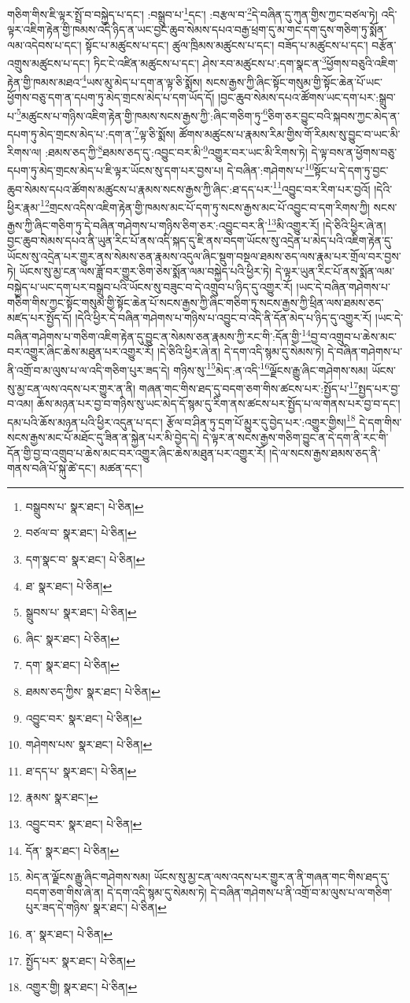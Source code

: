 གཅིག་གིས་ཇི་ལྟར་སྤྲོ་བ་བསྐྱེད་པ་དང་། :བསྒྲུབ་པ་\footnote{བསྒྲུབས་པ་  སྣར་ཐང་།  པེ་ཅིན། }དང་། :བརྩལ་བ་\footnote{བཙལ་བ་  སྣར་ཐང་།  པེ་ཅིན། }དེ་བཞིན་དུ་ཀུན་གྱིས་ཀྱང་བཙལ་ཏེ། འདི་ལྟར་འཇིག་རྟེན་གྱི་ཁམས་འདི་ཉིད་ན་ཡང་བྱང་ཆུབ་སེམས་དཔའ་བརྒྱ་ཕྲག་དུ་མ་གང་དག་དུས་གཅིག་ཏུ་སྨོན་ལམ་འདེབས་པ་དང་། སྟོང་པ་མཚུངས་པ་དང་། ཚུལ་ཁྲིམས་མཚུངས་པ་དང་། བཟོད་པ་མཚུངས་པ་དང་། བརྩོན་འགྲུས་མཚུངས་པ་དང་། ཏིང་ངེ་འཛིན་མཚུངས་པ་དང་། ཤེས་རབ་མཚུངས་པ་:དག་སྣང་ན་\footnote{དག་སྣང་བ་  སྣར་ཐང་།  པེ་ཅིན། }ཕྱོགས་བཅུའི་འཇིག་རྟེན་གྱི་ཁམས་མཐའ་\footnote{ཐ་  སྣར་ཐང་།  པེ་ཅིན། }ཡས་མུ་མེད་པ་དག་ན་ལྟ་ཅི་སྨོས། སངས་རྒྱས་ཀྱི་ཞིང་སྟོང་གསུམ་གྱི་སྟོང་ཆེན་པོ་ཡང་ཕྱོགས་བཅུ་དག་ན་དཔག་ཏུ་མེད་གྲངས་མེད་པ་དག་ཡོད་དོ། །བྱང་ཆུབ་སེམས་དཔའ་ཚོགས་ཡང་དག་པར་:སྒྲུབ་པ་\footnote{སྒྲུབས་པ་  སྣར་ཐང་།  པེ་ཅིན། }མཚུངས་པ་གཉིས་འཇིག་རྟེན་གྱི་ཁམས་སངས་རྒྱས་ཀྱི་:ཞིང་གཅིག་ཏུ་\footnote{ཞིང་  སྣར་ཐང་།  པེ་ཅིན། }ཅིག་ཅར་བྱུང་བའི་སྐབས་ཀྱང་མེད་ན་དཔག་ཏུ་མེད་གྲངས་མེད་པ་:དག་ན་\footnote{དག་  སྣར་ཐང་།  པེ་ཅིན། }ལྟ་ཅི་སྨོས། ཚོགས་མཚུངས་པ་རྣམས་རིམ་གྱིས་གོ་རིམས་སུ་བྱུང་བ་ཡང་མི་རིགས་ལ། :ཐམས་ཅད་ཀྱི་\footnote{ཐམས་ཅད་ཀྱིས་  སྣར་ཐང་།  པེ་ཅིན། }ཐམས་ཅད་དུ་:འབྱུང་བར་མི་\footnote{འབྱུང་བར་  སྣར་ཐང་།  པེ་ཅིན། }འགྱུར་བར་ཡང་མི་རིགས་ཏེ། དེ་ལྟ་བས་ན་ཕྱོགས་བཅུ་དཔག་ཏུ་མེད་གྲངས་མེད་པ་ཇི་ལྟར་ཡོངས་སུ་དག་པར་བྱས་པ། དེ་བཞིན་:གཤེགས་པ་\footnote{གཤེགས་པས་  སྣར་ཐང་།  པེ་ཅིན། }སྟོང་པ་དེ་དག་ཏུ་བྱང་ཆུབ་སེམས་དཔའ་ཚོགས་མཚུངས་པ་རྣམས་སངས་རྒྱས་ཀྱི་ཞིང་:ཐ་དད་པར་\footnote{ཐ་དད་པ་  སྣར་ཐང་།  པེ་ཅིན། }འབྱུང་བར་རིག་པར་བྱའོ། །དེའི་ཕྱིར་རྣམ་\footnote{རྣམས་  སྣར་ཐང་། }གྲངས་འདིས་འཇིག་རྟེན་གྱི་ཁམས་མང་པོ་དག་ཏུ་སངས་རྒྱས་མང་པོ་འབྱུང་བ་དག་རིགས་ཀྱི། སངས་རྒྱས་ཀྱི་ཞིང་གཅིག་ཏུ་དེ་བཞིན་གཤེགས་པ་གཉིས་ཅིག་ཅར་:འབྱུང་བར་ནི་\footnote{འབྱུང་བར་  སྣར་ཐང་།  པེ་ཅིན། }མི་འགྱུར་རོ། །དེ་ཅིའི་ཕྱིར་ཞེ་ན། བྱང་ཆུབ་སེམས་དཔའ་ནི་ཡུན་རིང་པོ་ནས་འདི་སྐད་དུ་ཇི་ནས་བདག་ཡོངས་སུ་འདྲེན་པ་མེད་པའི་འཇིག་རྟེན་དུ་ཡོངས་སུ་འདྲེན་པར་གྱུར་ནས་སེམས་ཅན་རྣམས་འདུལ་ཞིང་སྡུག་བསྔལ་ཐམས་ཅད་ལས་རྣམ་པར་གྲོལ་བར་བྱས་ཏེ། ཡོངས་སུ་མྱ་ངན་ལས་ཟློ་བར་གྱུར་ཅིག་ཅེས་སྨོན་ལམ་བསྐྱེད་པའི་ཕྱིར་ཏེ། དེ་ལྟར་ཡུན་རིང་པོ་ནས་སྨོན་ལམ་བསྐྱེད་པ་ཡང་དག་པར་བསྒྲུབ་པའི་ཡོངས་སུ་བཟུང་བ་དེ་འགྲུབ་པ་ཉིད་དུ་འགྱུར་རོ། །ཡང་དེ་བཞིན་གཤེགས་པ་གཅིག་གིས་ཀྱང་སྟོང་གསུམ་གྱི་སྟོང་ཆེན་པོ་སངས་རྒྱས་ཀྱི་ཞིང་གཅིག་ཏུ་སངས་རྒྱས་ཀྱི་ཕྲིན་ལས་ཐམས་ཅད་མཛད་པར་སྤྱོད་དོ། །དེའི་ཕྱིར་དེ་བཞིན་གཤེགས་པ་གཉིས་པ་འབྱུང་བ་འདི་ནི་དོན་མེད་པ་ཉིད་དུ་འགྱུར་རོ། །ཡང་དེ་བཞིན་གཤེགས་པ་གཅིག་འཇིག་རྟེན་དུ་བྱུང་ན་སེམས་ཅན་རྣམས་ཀྱི་རང་གི་:དོན་གྱི་\footnote{དོན་  སྣར་ཐང་།  པེ་ཅིན། }བྱ་བ་འགྲུབ་པ་ཆེས་མང་བར་འགྱུར་ཞིང་ཆེས་མཐུན་པར་འགྱུར་རོ། །དེ་ཅིའི་ཕྱིར་ཞེ་ན། དེ་དག་འདི་སྙམ་དུ་སེམས་ཏེ། དེ་བཞིན་གཤེགས་པ་ནི་འགྲོ་བ་མ་ལུས་པ་ལ་འདི་གཅིག་པུར་ཟད་དེ། གཉིས་སུ་\footnote{མེད་ན་ལྗོངས་རྒྱུ་ཞིང་གཤེགས་སམ། ཡོངས་སུ་མྱ་ངན་ལས་འདས་པར་གྱུར་ན་ནི་གཞན་གང་གིས་ཐད་དུ་བདག་ཅག་གིས་ཞེ་ན། དེ་དག་འདི་སྙམ་དུ་སེམས་ཏེ། དེ་བཞིན་གཤེགས་པ་ནི་འགྲོ་བ་མ་ལུས་པ་ལ་གཅིག་པུར་ཟད་དེ་གཉིས་  སྣར་ཐང་།  པེ་ཅིན། }མེད་:ན་འདི་\footnote{ན་  སྣར་ཐང་།  པེ་ཅིན། }ལྗོངས་རྒྱུ་ཞིང་གཤེགས་སམ། ཡོངས་སུ་མྱ་ངན་ལས་འདས་པར་གྱུར་ན་ནི། གཞན་གང་གིས་ཐད་དུ་བདག་ཅག་གིས་ཚངས་པར་:སྤྱོད་པ་\footnote{སྤྱོད་པར་  སྣར་ཐང་།  པེ་ཅིན། }སྤྱད་པར་བྱ་བ་འམ། ཆོས་མཉན་པར་བྱ་བ་གཉིས་སུ་ཡང་མེད་དོ་སྙམ་དུ་རིག་ནས་ཚངས་པར་སྤྱོད་པ་ལ་གནས་པར་བྱ་བ་དང་། དམ་པའི་ཆོས་མཉན་པའི་ཕྱིར་འདུན་པ་དང་། རྩོལ་བ་ཤིན་ཏུ་དྲག་པོ་མྱུར་དུ་བྱེད་པར་:འགྱུར་གྱིས།\footnote{འགྱུར་གྱི།  སྣར་ཐང་།  པེ་ཅིན། } དེ་དག་གིས་སངས་རྒྱས་མང་པོ་མཐོང་དུ་ཟིན་ན་སྐྱེན་པར་མི་བྱེད་དེ། དེ་ལྟར་ན་སངས་རྒྱས་གཅིག་བྱུང་ན་དེ་དག་ནི་རང་གི་དོན་གྱི་བྱ་བ་འགྲུབ་པ་ཆེས་མང་བར་འགྱུར་ཞིང་ཆེས་མཐུན་པར་འགྱུར་རོ། །དེ་ལ་སངས་རྒྱས་ཐམས་ཅད་ནི་གནས་བཞི་པོ་སྐུ་ཚེ་དང་། མཚན་དང་། 